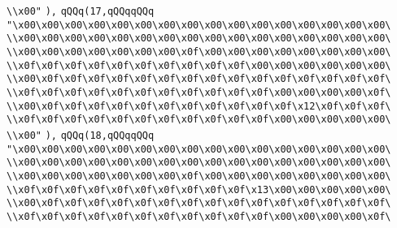 \verb|\\x00"|\newline
\verb|),|\newline
\verb|qQQq(17,qQQqqQQq|\newline
\verb|"\x00\x00\x00\x00\x00\x00\x00\x00\x00\x00\x00\x00\x00\x00\x00\x00\|\newline
\verb|\\x00\x00\x00\x00\x00\x00\x00\x00\x00\x00\x00\x00\x00\x00\x00\x00\|\newline
\verb|\\x00\x00\x00\x00\x00\x00\x00\x0f\x00\x00\x00\x00\x00\x00\x00\x00\|\newline
\verb|\\x0f\x0f\x0f\x0f\x0f\x0f\x0f\x0f\x0f\x0f\x00\x00\x00\x00\x00\x00\|\newline
\verb|\\x00\x0f\x0f\x0f\x0f\x0f\x0f\x0f\x0f\x0f\x0f\x0f\x0f\x0f\x0f\x0f\|\newline
\verb|\\x0f\x0f\x0f\x0f\x0f\x0f\x0f\x0f\x0f\x0f\x0f\x00\x00\x00\x00\x0f\|\newline
\verb|\\x00\x0f\x0f\x0f\x0f\x0f\x0f\x0f\x0f\x0f\x0f\x0f\x12\x0f\x0f\x0f\|\newline
\verb|\\x0f\x0f\x0f\x0f\x0f\x0f\x0f\x0f\x0f\x0f\x0f\x00\x00\x00\x00\x00\|\newline
\verb|\\x00"|\newline
\verb|),|\newline
\verb|qQQq(18,qQQqqQQq|\newline
\verb|"\x00\x00\x00\x00\x00\x00\x00\x00\x00\x00\x00\x00\x00\x00\x00\x00\|\newline
\verb|\\x00\x00\x00\x00\x00\x00\x00\x00\x00\x00\x00\x00\x00\x00\x00\x00\|\newline
\verb|\\x00\x00\x00\x00\x00\x00\x00\x0f\x00\x00\x00\x00\x00\x00\x00\x00\|\newline
\verb|\\x0f\x0f\x0f\x0f\x0f\x0f\x0f\x0f\x0f\x0f\x13\x00\x00\x00\x00\x00\|\newline
\verb|\\x00\x0f\x0f\x0f\x0f\x0f\x0f\x0f\x0f\x0f\x0f\x0f\x0f\x0f\x0f\x0f\|\newline
\verb|\\x0f\x0f\x0f\x0f\x0f\x0f\x0f\x0f\x0f\x0f\x0f\x00\x00\x00\x00\x0f\|\newline
